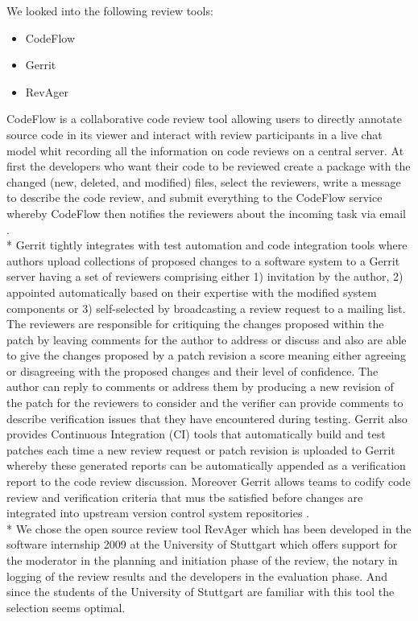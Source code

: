 We looked into the following review tools:
\begin{itemize}
	\item CodeFlow
	\item Gerrit
	\item RevAger
\end{itemize}
CodeFlow is a collaborative code review tool allowing users to directly annotate source code in its viewer and interact with review participants in a live chat model whit recording all the information on code reviews on a central server. At first the developers who want their code to be reviewed create a package with the changed (new, deleted, and modified) files, select the reviewers, write a message to describe the code review, and submit everything to the CodeFlow service whereby CodeFlow then notifies the reviewers about the incoming task via email \cite{Bacchelli:2013:EOC:2486788.2486882}. \\*
Gerrit tightly integrates with test automation and code integration tools where authors upload collections of proposed changes to a software system to a Gerrit server having a set of reviewers comprising either 1) invitation by the author, 2) appointed automatically based on their expertise with the modified system components or 3) self-selected by broadcasting a review request to a mailing list. The reviewers are responsible for critiquing the changes proposed within the patch by leaving comments for the author to address or discuss and also are able to give the changes proposed by a patch revision a score meaning either agreeing or disagreeing with the proposed changes and their level of confidence. The author can reply to comments or address them by producing a new revision of the patch for the reviewers to consider and the verifier can provide comments to describe verification issues that they have encountered during testing. Gerrit also provides Continuous Integration (CI) tools that automatically build and test patches each time a new review request or patch revision is uploaded to Gerrit whereby these generated reports can be automatically appended as a verification report to the code review discussion. Moreover Gerrit allows teams to codify code review and verification criteria that mus tbe satisfied before changes are integrated into upstream version control system repositories \cite{McIntosh:2014:ICR:2597073.2597076}. \\*
We chose the open source review tool RevAger which has been developed in the software internship 2009 at the University of Stuttgart which offers support for the moderator in the planning and initiation phase of the review, the notary in logging of the review results and the developers in the evaluation phase. And since the students of the University of Stuttgart are familiar with this tool the selection seems optimal.

